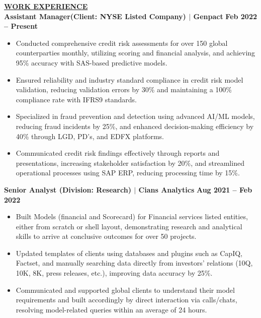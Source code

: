 \documentclass{article}
\begin{document}
% 
%
\noindent \textbf{\underline{WORK EXPERIENCE}} \\
\noindent \textbf{Assistant Manager(Client: NYSE Listed Company) $\mid$ Genpact} \hfill \textbf{Feb 2022 – Present}
\begin{itemize}[noitemsep,nolistsep,leftmargin=*]
    \item {\small Conducted comprehensive credit risk assessments for over 150 global counterparties monthly, utilizing scoring and financial analysis, and achieving 95\% accuracy with SAS-based predictive models.}
    \item {\small Ensured reliability and industry standard compliance in credit risk model validation, reducing validation errors by 30\% and maintaining a 100\% compliance rate with IFRS9 standards.}
    \item {\small Specialized in fraud prevention and detection using advanced AI/ML models, reducing fraud incidents by 25\%, and enhanced decision-making efficiency by 40\% through LGD, PD’s, and EDFX platforms.}
    \item {\small Communicated credit risk findings effectively through reports and presentations, increasing stakeholder satisfaction by 20\%, and streamlined operational processes using SAP ERP, reducing processing time by 15\%.}
\end{itemize}
\vspace{1mm}
\noindent \textbf{Senior Analyst (Division: Research) $\mid$ Cians Analytics} \hfill \textbf{Aug 2021 – Feb 2022}
\begin{itemize}[noitemsep,nolistsep,leftmargin=*]
    \item {\small Built Models (financial and Scorecard) for Financial services listed entities, either from scratch or shell layout, demonstrating research and analytical skills to arrive at conclusive outcomes for over 50 projects.}
    \item {\small Updated templates of clients using databases and plugins such as CapIQ, Factset, and manually searching data directly from investors' relations (10Q, 10K, 8K, press releases, etc.), improving data accuracy by 25\%.}
    \item {\small Communicated and supported global clients to understand their model requirements and built accordingly by direct interaction via calls/chats, resolving model-related queries within an average of 24 hours.}
\end{itemize}
\end{document}
